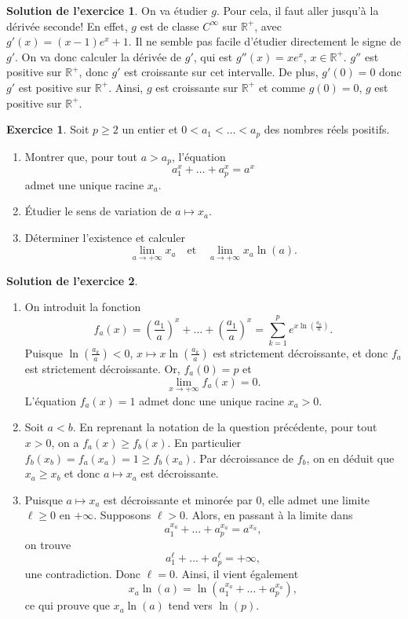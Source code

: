 \documentclass[a4paper, 11pt,openany]{article}%
\theoremstyle{plain}
\theoremstyle{definition}
\newtheorem{exo}{Exercice}
\newtheorem{sol}{Solution de l'exercice}
\theoremstyle{remark}
\newcommand{\R}{\mathbb{R}}
\begin{document}
\begin{sol}
On va étudier $g$. Pour cela, il faut aller jusqu'à la dérivée seconde! En effet, $g$ est de classe $C^{\infty}$ sur $\R^+$, avec $g'(x)=(x-1)e^x+1$. Il ne semble pas facile d'étudier directement le signe de $g'$. On va donc calculer la dérivée de $g'$, qui est $g''(x)=xe^x$, $x \in \R^+$. $g''$ est positive sur $\R^+$, donc $g'$ est croissante sur cet intervalle. De plus, $g'(0)=0$ donc $g'$ est positive sur $\R^+$. Ainsi, $g$ est croissante sur $\R^+$ et comme $g(0)=0$, $g$ est positive sur $\R^+$.
\end{sol}


\begin{exo}
Soit $p \geqslant 2$ un entier et $0<a_1< \dots <a_p$ des nombres réels positifs.
\begin{enumerate}
\item Montrer que, pour tout $a>a_p$, l'équation 
\[ a_1^x+ \dots +a_p^x =a^x\]
 admet une unique racine $x_a$.
 \item Étudier le sens de variation de $a \mapsto x_a$.
 \item Déterminer l'existence et calculer 
 \[ \lim_{a\to + \infty} x_a \quad \text{et} \quad \lim_{ a \to + \infty} x_a \ln(a). \]
\end{enumerate}
\end{exo}

\begin{sol}
\begin{enumerate}
\item On introduit la fonction 
\[ f_a(x)= \left( \frac{a_1}{a} \right)^x + \dots + \left( \frac{a_1}{a} \right)^x = \sum_{k=1}^p e^{x \ln \left( \frac{a_k}{a} \right)}.\]
Puisque $\ln \left( \frac{a_k}{a} \right)<0$, $x \mapsto x\ln \left( \frac{a_k}{a} \right)$ est strictement décroissante, et donc $f_a$ est strictement décroissante. Or, $f_a(0)=p$ et \[ \lim_{x\to + \infty} f_a(x) = 0.\]
L'équation $f_a(x)=1$ admet donc une unique racine $x_a>0$.
 \item Soit $a<b$. En reprenant la notation de la question précédente, pour tout $x>0$, on a $f_a(x) \geqslant f_b(x)$. En particulier $f_b(x_b)=f_a(x_a)=1 \geqslant f_b(x_a)$. Par décroissance de $f_b$, on en déduit que $x_a \geqslant x_b$ et donc $a \mapsto x_a$ est décroissante.
 \item Puisque $a\mapsto x_a$ est décroissante et minorée par $0$, elle admet une limite $\ell \geqslant 0$ en $+ \infty$. Supposons $\ell >0$. Alors, en passant à la limite dans 
 \[ a_1^{x_a} + \dots + a_p^{x_a}=a^{x_a},\]
 on trouve 
  \[ a_1^{\ell} + \dots + a_p^{\ell}=+ \infty,\]
une contradiction. Donc $\ell=0$. Ainsi, il vient également
\[ x_a \ln(a) = \ln \left(a_1^{x_a} + \dots + a_p^{x_a} \right),\]
ce qui prouve que $x_a \ln(a)$ tend vers $\ln(p)$. 
\end{enumerate}
\end{sol}
\end{document}
